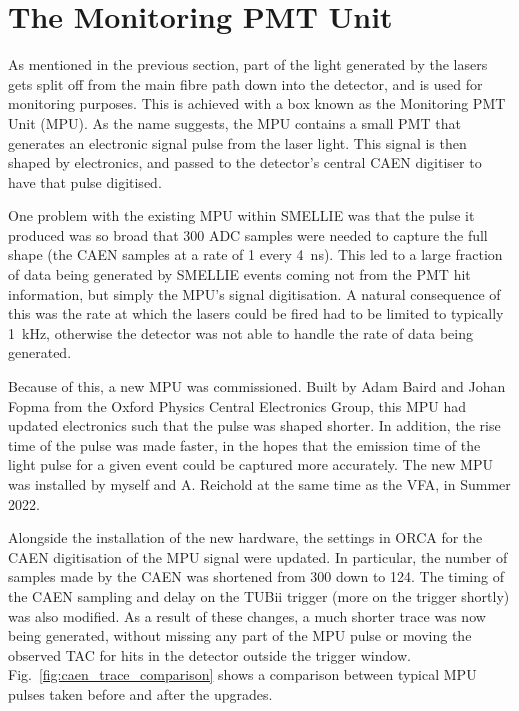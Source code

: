 \section{The Monitoring PMT Unit}\label{sec:smellie_mpu}
As mentioned in the previous section, part of the light generated by the lasers gets split off from the main fibre path down into the detector, and is used for monitoring purposes. This is achieved with a box known as the Monitoring PMT Unit (MPU). As the name suggests, the MPU contains a small PMT that generates an electronic signal pulse from the laser light. This signal is then shaped by electronics, and passed to the detector's central CAEN digitiser to have that pulse digitised.

One problem with the existing MPU within SMELLIE was that the pulse it produced was so broad that 300 ADC samples were needed to capture the full shape (the CAEN samples at a rate of 1 every \SI{4}{\ns}). This led to a large fraction of data being generated by SMELLIE events coming not from the PMT hit information, but simply the MPU's signal digitisation. A natural consequence of this was the rate at which the lasers could be fired had to be limited to typically \SI{1}{\kHz}, otherwise the detector was not able to handle the rate of data being generated.

Because of this, a new MPU was commissioned. Built by Adam Baird and Johan Fopma from the Oxford Physics Central Electronics Group, this MPU had updated electronics such that the pulse was shaped shorter. In addition, the rise time of the pulse was made faster, in the hopes that the emission time of the light pulse for a given event could be captured more accurately. The new MPU was installed by myself and A. Reichold at the same time as the VFA, in Summer 2022.

Alongside the installation of the new hardware, the settings in ORCA for the CAEN digitisation of the MPU signal were updated. In particular, the number of samples made by the CAEN was shortened from 300 down to 124. The timing of the CAEN sampling and delay on the TUBii trigger (more on the trigger shortly) was also modified. As a result of these changes, a much shorter trace was now being generated, without missing any part of the MPU pulse or moving the observed TAC for hits in the detector outside the trigger window. Fig.~\ref{fig:caen_trace_comparison} shows a comparison between typical MPU pulses taken before and after the upgrades.

